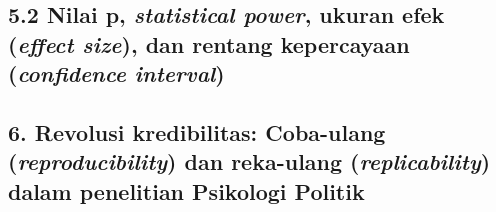\documentclass[
  english,
  man]{apa6}
\begin{document}
\hypertarget{nilai-p-statistical-power-ukuran-efek-effect-size-dan-rentang-kepercayaan-confidence-interval}{%
\subsection{\texorpdfstring{5.2 Nilai p, \emph{statistical power}, ukuran efek (\emph{effect size}), dan rentang kepercayaan (\emph{confidence interval})}{5.2 Nilai p, statistical power, ukuran efek (effect size), dan rentang kepercayaan (confidence interval)}}\label{nilai-p-statistical-power-ukuran-efek-effect-size-dan-rentang-kepercayaan-confidence-interval}}

\hypertarget{revolusi-kredibilitas-coba-ulang-reproducibility-dan-reka-ulang-replicability-dalam-penelitian-psikologi-politik}{%
\subsection{\texorpdfstring{6. Revolusi kredibilitas: Coba-ulang (\emph{reproducibility}) dan reka-ulang (\emph{replicability}) dalam penelitian Psikologi Politik}{6. Revolusi kredibilitas: Coba-ulang (reproducibility) dan reka-ulang (replicability) dalam penelitian Psikologi Politik}}\label{revolusi-kredibilitas-coba-ulang-reproducibility-dan-reka-ulang-replicability-dalam-penelitian-psikologi-politik}}
\end{document}

